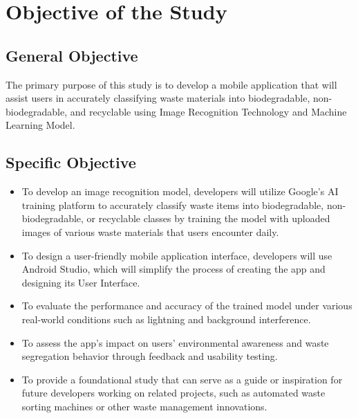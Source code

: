 \section{Objective of the Study}

\subsection{General Objective}
The primary purpose of this study is to develop a mobile application that will assist users in accurately classifying waste materials into biodegradable, non-biodegradable, and recyclable using Image Recognition Technology and Machine Learning Model.

\subsection{Specific Objective}
\begin{itemize}
	\item To develop an image recognition model, developers will utilize Google's AI training platform to accurately classify waste items into biodegradable, non-biodegradable, or recyclable classes by training the model with uploaded images of various waste materials that users encounter daily.
	
	\item To design a user-friendly mobile application interface, developers will use Android Studio, which will simplify the process of creating the app and designing its User Interface.
	
	\item To evaluate the performance and accuracy of the trained model under various real-world conditions such as lightning and background interference.
	
	\item To assess the app's impact on users' environmental awareness and waste segregation behavior through feedback and usability testing.
	
	\item To provide a foundational study that can serve as a guide or inspiration for future developers working on related projects, such as automated waste sorting machines or other waste management innovations.
\end{itemize}